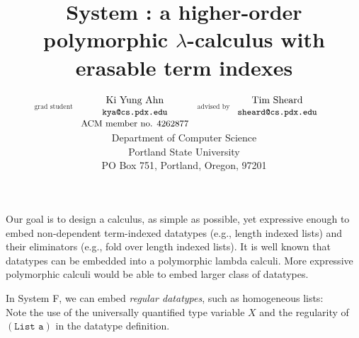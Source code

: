 \documentclass{article}
\title{System \Fi: a higher-order polymorphic $\lambda$-calculus with erasable term indexes \vspace*{-5pt}}
\author{
 $\begin{matrix}_\text{grad student}\\ ~ \\ ~ \end{matrix}\!\!\!\!\!\!\!\!$
 $\begin{matrix}\text{Ki Yung Ahn} \\ \texttt{\small kya@cs.pdx.edu} \\
   \text{\small ACM member no. 4262877}   \end{matrix}$
 $\!\!\!\!\begin{matrix}_\text{advised by}\\ ~ \\ ~ \end{matrix}$
 $\begin{matrix}\text{Tim Sheard} \\ \texttt{\small sheard@cs.pdx.edu} \\ ~ \end{matrix}
 \qquad$
 \vspace*{5pt} \\
 \small Department of Computer Science \\
 \small Portland State University \\ \small PO Box 751, Portland, Oregon, 97201
}
\date{\small \vspace*{-12pt}
 }
\begin{document}
\maketitle \vspace*{-15pt}
Our goal is to design a calculus, as simple as possible, yet
expressive enough to embed non-dependent term-indexed datatypes
(e.g., length indexed lists) and their eliminators (e.g., fold over
length indexed lists). It is well known that datatypes can be embedded into
a polymorphic lambda calculi. More expressive polymorphic calculi would be
able to embed larger class of datatypes.

In System \textsf{F}, we can embed \emph{regular datatypes},
such as homogeneous lists:
\\
Note the use of the universally quantified type variable $X$
and the regularity of $(\texttt{List a})$ in the datatype definition.
\end{document}
